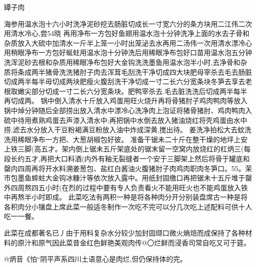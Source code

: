 \begin{recipe}{罈子肉}

\ingredients


\cooking

\step 海参用温水泡十六小时洗净泥砂挖去肠脏切成长一寸宽六分的条方块用二江伟二次用清水冷心,尝54晓
再用净布一方包好鱼翅用温水泡十分钟洗净上面的水去子骨和杂质放入大硫中加清水一斤半上笼一小时出笼泌去水再用二汤伟一次用清水漂冷心用稍眼净布一方包好蜒蛀用温水泡十分钟洗后用稀眼净布包好口苗用温水泡五分钟洗浑泥砂去根和杂质用稀眼净布包好大金钩洗洗墨鱼用温水泡半小时,去净骨和杂质将条成两半猪骨洗洗猪肘子肉去浑茸毛刮洗干净切成四大块肥母宰杀去毛去肠脏切成两半每半毋切成两块肥瘦火腹刮洗干净切成一寸二长六分宽条块冬笋去享去老根取嫩尖部分切成一寸二长六分宽条块。肥鸭宰杀去.毛去脏洗洗后切成两半每半再切成两。
\step 锅中倒入清水十斤放入鸡蛋用旺火烧升再将骨猪肘子鸡肉鸭肉等放入锅中焯分钟随后全部捞出放入清水中漂冷心洗净肉上泡证将猪骨猪肘、鸡肉鸭肉入硫中待用煮熟鸡蛋去声漆入清水中;再把锅中水倒去放入猪油烧红将壳鸡蛋由水中捞,滤去水分放入干豆粉褐满豆粉放入油中炸成深黄,搅出待。
\step 姜洗净拍松大去蚊洗洗用稀眼净布一方把、大葱胡椒包好彼。
\step 准备干锯未二十斤在整干燥的地坪上安上铁三脚(高五才。架内倒上锯未五斤架底处的锯末留一空窝内放烧红的杠炳三(每段长约五才,再把大口料酒(内外有釉无裂缝者一个安于三脚架上然后将骨于罐底和罄内四周再将开水料溯姜葱包、盐红白酱油火腹猪肘子肉鸡肉职肉冬笋口。55。茉市包墨鱼蟀蛀大金钩冰糠汁等依次放入露中。用纸封固缴口再把锯未十五斤堆于罄外四周熬四五小时(在烈的过程中要有专人负责看火不能用旺火也不能鸡蛋放入铁中再熬半小时即成。
\step 此菜吃法有两积一种是将各种肉分开分别装盘席古一种是将各积肉分小镶盘上席此菜一般适冬制作一次吃不完可以分几次吃上述配料可供十人吃一一餐。

\notes

此菜在成都著名已丿由于用料复杂水分较少加封固缬口微火熵焙而成保持了各种材料的原汁和原气因此菜昔金红色鲜艳美观肉传@〇烂鲜而浸香司常自吃又可于筵。

@炳音《怕“阴平声系四川土语意心是肉烂,但仍保持体的完。

\end{recipe}

